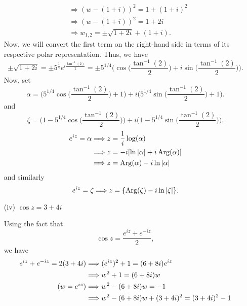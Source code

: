 \documentclass[a4paper]{article}
\begin{document}
\begin{enumerate}
\begin{solution}
\begin{align*}
                                                     &\Longrightarrow (w - (1+i))^{2} = 1 + (1+i)^{2} \\
                                                     &\Longrightarrow (w - (1+i))^{2 } = 1 + 2i \\
                                                     &\Longrightarrow  w_{1,2} = \pm \sqrt{ 1 + 2i } + (1+i). 
        \end{align*}
        Now, we will convert the first term on the right-hand side in terms of its respective polar representation. Thus, we have
        \[  \pm \sqrt{ 1 + 2i }  = \pm  5^{\frac{1  }{ 4 } } e^{i \frac{ \tan^{-1}(2) }{ 2 } } = \pm 5^{1/4} \Big(  \cos \Big(  \frac{ \tan^{-1}(2) }{ 2 }  \Big) + i \sin \Big(  \frac{ \tan^{-1}(2) }{ 2 }  \Big) \Big).  \]
        Now, set 
        \[  \alpha = \Big(  5^{1/4} \cos \Big(  \frac{ \tan^{-1}(2) }{ 2 }  \Big) + 1  \Big) + i \Big(  5^{1/4} \sin \Big(  \frac{ \tan^{-1}(2) }{ 2 }  \Big) + 1  \Big). \]
        and
        \[  \zeta = \Big(  1 - 5^{1/4} \cos \Big(  \frac{ \tan^{-1}(2) }{ 2 }  \Big)  \Big) + i \Big(  1 - 5^{1/4} \sin \Big(  \frac{ \tan^{-1}(2) }{ 2 }  \Big)  \Big). \]
        \begin{align*}
            e^{iz} = \alpha  &\Longrightarrow z = \frac{ 1 }{ i } \log (\alpha)  \\
                              &\Longrightarrow z = -i [\ln | \alpha | + i \operatorname{Arg}(\alpha) ] \\ 
                              &\Longrightarrow z = \operatorname{Arg}(\alpha) - i \ln | \alpha |
        \end{align*}
        and similarly
    \[  e^{iz} = \zeta \Longrightarrow z = \{  \operatorname{Arg}(\zeta) - i \ln | \zeta | \}.  \]
        \end{solution}
    \item[(iv)] \( \cos z = 3 + 4i \)
        \begin{solution}
        Using the fact that 
        \[  \cos z = \frac{ e^{iz} + e^{-iz} }{ 2 },  \]
        we have
        \begin{align*}
            e^{iz} + e^{-iz} = 2 (3 + 4i) &\Longrightarrow (e^{iz})^{2} + 1 = (6+8i) e^{iz}  \\
                                          &\Longrightarrow w^{2} + 1 = (6+8i)w \\ \tag{\( w = e^{iz} \)}
                                          &\Longrightarrow w^{2} - (6+8i)w = -1 \\
                                          &\Longrightarrow w^{2} - (6+8i)w + (3+4i)^{2} = (3+4i)^{2} - 1 \\

\end{align*}
\end{solution}
\end{enumerate}
\end{document}
